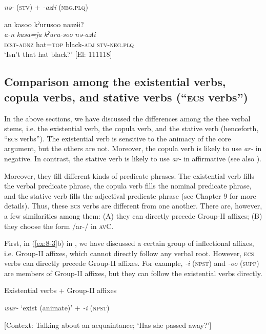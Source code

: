 \ex \textit{nə-} (\textsc{stv}) + \textit{-azɨi} (\textsc{neg}.\textsc{plq})

{\TM}
\glll  an  kasoo  kˀurusoo  nəəzɨi?\\
\textit{a-n}  \textit{kasa=ja}  \textit{kˀuru-soo}  \textit{nə-azɨi}\\
\textsc{dist}-\textsc{adnz}  hat=\textsc{top}  black-\textsc{adj}  \textsc{stv}-\textsc{neg}.\textsc{plq}\\
\glt ‘Isn’t that hat black?’ [El: 111118]
\z
\z

\subsection{Comparison among the existential verbs, copula verbs, and stative verbs (“\textsc{ecs} verbs”)}

In the above sections, we have discussed the differences among the thee verbal stems, i.e. the existential verb, the copula verb, and the stative verb (henceforth, “\textsc{ecs} verbs”). The existential verb is sensitive to the animacy of the core argument, but the others are not. Moreover, the copula verb is likely to use \textit{ar-} in negative. In contrast, the stative verb is likely to use \textit{ar-} in affirmative (see also ).

Moreover, they fill different kinds of predicate phrases. The existential verb fills the verbal predicate phrase, the copula verb fills the nominal predicate phrase, and the stative verb fills the adjectival predicate phrase (see Chapter 9 for more details). Thus, these \textsc{ecs} verbs are different from one another. There are, however, a few similarities among them: (A) they can directly precede Group-II affixes; (B) they choose the form /ar-/ in \textsc{av}C.

  First, in (\ref{ex:8-3}b) in , we have discussed a certain group of inflectional affixes, i.e. Group-II affixes, which cannot directly follow any verbal root. However, \textsc{ecs} verbs can directly precede Group-II affixes. For example, \textit{-i} (\textsc{npst}) and \textit{-oo} (\textsc{supp}) are members of Group-II affixes, but they can follow the existential verbs directly.

\ea\label{ex:8-50}
  Existential verbs + Group-II affixes

\ea \textit{wur-} ‘exist (animate)’ + \textit{-i} (\textsc{npst})

    [Context: Talking about an acquaintance;{\US}
\glll  ‘Has she passed away?’]\\

